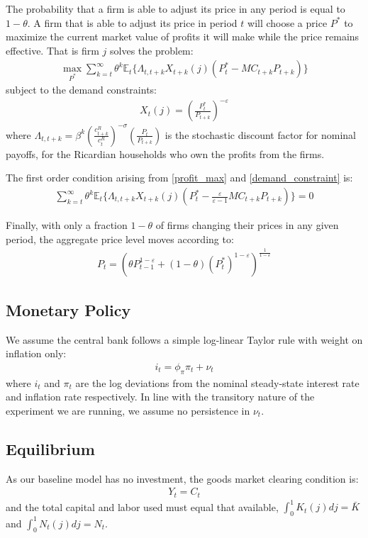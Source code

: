 \documentclass[titlepage]{\econtex}\newcommand{\texname}{ConsumptionHeterogeneity}
\begin{document}
The probability that a firm is able to adjust its price in any period is equal to $1-\theta$. A firm that is able to adjust its price in period $t$ will choose a price $P^*$ to maximize the current market value of profits it will make while the price remains effective. That is firm $j$ solves the problem:
\begin{align}
\underset{P^*}{\max} \sum_{k=t}^{\infty} \theta^k \mathbb{E}_t \{{\Lambda}_{t,t+k} X_{t+k}(j) (P_t^* - MC_{t+k}P_{t+k}) \} \label{profit_max}
\end{align}
subject to the demand constraints:
\begin{align}
X_t(j) = \left(\frac{P_t^*}{P_{t+k}}\right)^{-\varepsilon} \label{demand_constraint}
\end{align}
where ${\Lambda}_{t,t+k} = \beta^k \left(\frac{c^R_{t+k}}{c^R_{t}}\right)^{-\sigma} \left( \frac{P_t}{P_{t+k}} \right)$ is the stochastic discount factor for nominal payoffs, for the Ricardian households who own the profits from the firms. 

The first order condition arising from \ref{profit_max}  and \ref{demand_constraint} is:
\begin{align}
\sum_{k=t}^{\infty} \theta^k \mathbb{E}_t \Big\{{\Lambda}_{t,t+k} X_{t+k}(j) \left(P_t^* - \frac{\varepsilon}{\varepsilon-1}MC_{t+k} P_{t+k}\right)  \Big\} = 0 \label{foc_pricing}
\end{align}

Finally, with only a fraction $1-\theta$ of firms changing their prices in any given period, the aggregate price level moves according to:
\begin{align*}
P_t = \left(   \theta P_{t-1}^{1-\varepsilon} + (1-\theta)(P_t^*)^{1-\varepsilon}\right)^{\frac{1}{1-\varepsilon}}
\end{align*}

\subsection{Monetary Policy}
We assume the central bank follows a simple log-linear Taylor rule with weight on inflation only:
\begin{align}
i_t = \phi_{\pi} \pi_t + \nu_t	\label{taylor_rule}
\end{align}
where $i_t$ and $\pi_t$ are the log deviations from the nominal steady-state interest rate and inflation rate respectively. In line with the transitory nature of the experiment we are running, we assume no persistence in $\nu_t$.

\subsection{Equilibrium}
As our baseline model has no investment, the goods market clearing condition is:
\begin{align}
Y_t = C_t	\label{agg_prod}
\end{align}
and the total capital and labor used must equal that available, $\int_0^1 K_t(j)dj = \bar{K}$ and $\int_0^1 N_t(j)dj = N_t$.
\end{document}

